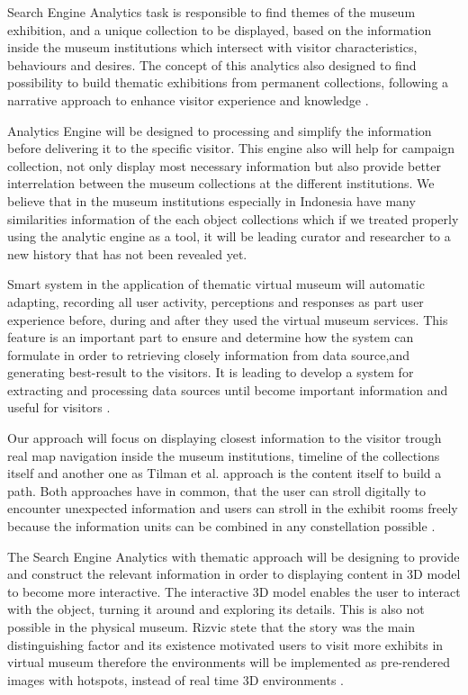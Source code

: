 Search Engine Analytics task is responsible to find themes of the museum exhibition, and a unique collection to be displayed, based on the information inside the museum institutions which intersect with visitor characteristics, behaviours and desires. The concept of this analytics also designed to find possibility to build thematic exhibitions from permanent collections, following a narrative approach to enhance visitor experience and knowledge \cite{Pescarin}.

Analytics Engine will be designed to processing and simplify the information before delivering it to the specific visitor. This engine also will help for campaign collection, not only display most necessary information but also provide better interrelation between the museum collections at the different institutions. We believe that in the museum institutions especially in Indonesia have many similarities information of the each object collections which if we treated properly using the analytic engine as a tool, it will be leading curator and researcher to a new history that has not been revealed yet.

Smart system in the application of thematic virtual museum will automatic adapting, recording all user activity, perceptions and responses as part user experience before, during and after they used the virtual museum services. This feature is an important part to ensure and determine how the system can formulate in order to retrieving closely information from data source,and generating best-result to the visitors. It is leading to develop a system for extracting and processing data sources until become important information and useful for visitors \cite{AnggaiBlekanovSergeev2014}.

Our approach will focus on displaying closest information to the visitor trough real map navigation inside the museum institutions, timeline of the collections itself and another one as Tilman et al. approach is the content itself to build a path. Both approaches have in common, that the user can stroll digitally to encounter unexpected information and users can stroll in the exhibit rooms freely because the information units can be combined in any constellation possible \cite{DeuschelHeussHumm}.

The Search Engine Analytics with thematic approach will be designing to provide and construct the relevant information in order to displaying content in 3D model to become more interactive. The interactive 3D model enables the user to interact with the object, turning it around and exploring its details. This is also not possible in the physical museum. Rizvic stete that the story was the main distinguishing factor and its existence motivated users to visit more exhibits in virtual museum therefore the environments will be implemented as pre-rendered images with hotspots, instead of real time 3D environments \cite{Rizvic}.

